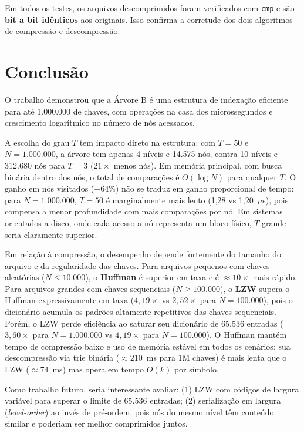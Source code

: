\documentclass{ifpr-pinhais}
\begin{document}
Em todos os testes, os arquivos descomprimidos foram verificados com \texttt{cmp} e são \textbf{bit a bit idênticos} aos originais. Isso confirma a corretude dos dois algoritmos de compressão e descompressão.

\section{Conclusão}

O trabalho demonstrou que a Árvore B é uma estrutura de indexação eficiente para até 1.000.000 de chaves, com operações na casa dos microssegundos e crescimento logarítmico no número de nós acessados.

A escolha do grau $T$ tem impacto direto na estrutura: com $T = 50$ e $N = 1.000.000$, a árvore tem apenas 4 níveis e 14.575 nós, contra 10 níveis e 312.680 nós para $T = 3$ ($21\times$ menos nós). Em memória principal, com busca binária dentro dos nós, o total de comparações é $O(\log N)$ para qualquer $T$. O ganho em nós visitados ($-64\%$) não se traduz em ganho proporcional de tempo: para $N = 1.000.000$, $T = 50$ é marginalmente mais lento (1,28 vs 1,20~$\mu$s), pois compensa a menor profundidade com mais comparações por nó. Em sistemas orientados a disco, onde cada acesso a nó representa um bloco físico, $T$ grande seria claramente superior.

Em relação à compressão, o desempenho depende fortemente do tamanho do arquivo e da regularidade das chaves. Para arquivos pequenos com chaves aleatórias ($N \leq 10.000$), o \textbf{Huffman} é superior em taxa e é $\approx 10\times$ mais rápido. Para arquivos grandes com chaves sequenciais ($N \geq 100.000$), o \textbf{LZW} supera o Huffman expressivamente em taxa ($4{,}19\times$ vs $2{,}52\times$ para $N = 100.000$), pois o dicionário acumula os padrões altamente repetitivos das chaves sequenciais. Porém, o LZW perde eficiência ao saturar seu dicionário de 65.536 entradas ($3{,}60\times$ para $N = 1.000.000$ vs $4{,}19\times$ para $N = 100.000$). O Huffman mantém tempo de compressão baixo e uso de memória estável em todos os cenários; sua descompressão via trie binária ($\approx 210$~ms para 1M chaves) é mais lenta que o LZW ($\approx 74$~ms) mas opera em tempo $O(k)$ por símbolo.

Como trabalho futuro, seria interessante avaliar: (1) LZW com códigos de largura variável para superar o limite de 65.536 entradas; (2) serialização em largura (\textit{level-order}) ao invés de pré-ordem, pois nós do mesmo nível têm conteúdo similar e poderiam ser melhor comprimidos juntos.
\end{document}

